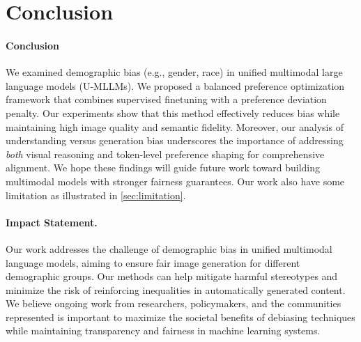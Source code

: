 \section{Conclusion}
\label{sec:limitation_conclusion}

\paragraph{Conclusion}
We examined demographic bias (e.g., gender, race) in unified multimodal large language models (U-MLLMs). We proposed a balanced preference optimization framework that combines supervised finetuning with a preference deviation penalty. Our experiments show that this method effectively reduces bias while maintaining high image quality and semantic fidelity. Moreover, our analysis of understanding versus generation bias underscores the importance of addressing \emph{both} visual reasoning and token-level preference shaping for comprehensive alignment. We hope these findings will guide future work toward building multimodal models with stronger fairness guarantees. Our work also have some limitation as illustrated in \autoref{sec:limitation}.


\paragraph{Impact Statement.}
Our work addresses the challenge of demographic bias in unified multimodal language models, aiming to ensure fair image generation for different demographic groups. Our methods can help mitigate harmful stereotypes and minimize the risk of reinforcing inequalities in automatically generated content. We believe ongoing work from researchers, policymakers, and the communities represented is important to maximize the societal benefits of debiasing techniques while maintaining transparency and fairness in machine learning systems. 

